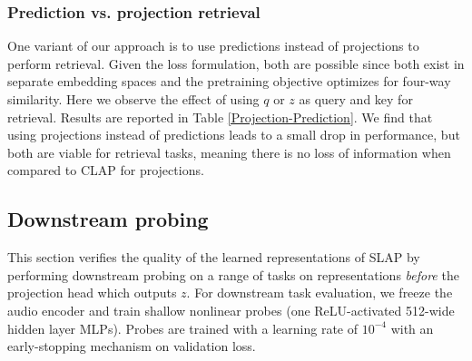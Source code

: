 \documentclass{article}
\begin{document}
\begin{table}[h]
\centering
{}
\caption{Retrieval results using predictions $q$ or projection embeddings $z$ as anchors. Best results are in \textbf{bold}.}
\label{Projection-Prediction}
\end{table}

\subsubsection{Prediction vs. projection retrieval}\label{Subsection:Prediction vs projection retrieval}

One variant of our approach is to use predictions instead of projections to perform retrieval. Given the loss formulation, both are possible since both exist in separate embedding spaces and the pretraining objective optimizes for four-way similarity. Here we observe the effect of using $q$ or $z$ as query and key for retrieval. Results are reported in Table \ref{Projection-Prediction}. We find that using projections instead of predictions leads to a small drop in performance, but both are viable for retrieval tasks, meaning there is no loss of information when compared to CLAP for projections.



\subsection{Downstream probing} \label{subsection: Downstream probing}

This section verifies the quality of the learned representations of SLAP by performing downstream probing on a range of tasks on representations \textit{before} the projection head which outputs $z$. For downstream task evaluation, we freeze the audio encoder and train shallow nonlinear probes (one ReLU-activated 512-wide hidden layer MLPs). Probes are trained with a learning rate of $10^{-4}$ with an early-stopping mechanism on validation loss.
\end{document}
